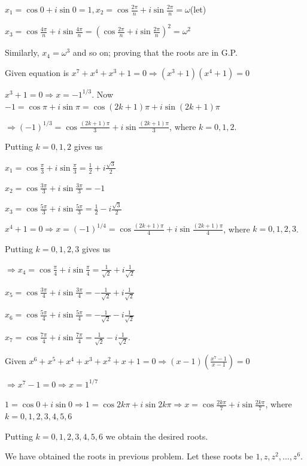   $x_1 = \cos0 + i\sin 0 = 1, x_2 = \cos\frac{2\pi}{n} + i\sin\frac{2\pi}{n} = \omega$(let)

  $x_3 = \cos\frac{4\pi}{n} + i\sin\frac{4\pi}{n} = \left(\cos\frac{2\pi}{n} + i\sin\frac{2\pi}{n}\right)^2
  = \omega^2$

  Similarly, $x_4 = \omega^3$ and so on; proving that the roots are in G.P.
\item Given equation is $x^7 + x^4 + x^3 + 1 = 0 \Rightarrow \left(x^3 + 1\right)\left(x^4 + 1\right) = 0$

  $x^3 + 1 = 0 \Rightarrow x = -1^{1/3}$. Now $-1 = \cos\pi + i\sin\pi = \cos(2k + 1)\pi + i\sin(2k + 1)\pi$

  $\Rightarrow (-1)^{1/3} = \cos\frac{(2k + 1)\pi}{3} + i\sin\frac{(2k + 1)\pi}{3}$, where $k= 0, 1, 2$.

  Putting $k= 0, 1, 2$ gives us

  $x_1 = \cos\frac{\pi}{3} + i\sin\frac{\pi}{3} = \frac{1}{2} + i\frac{\sqrt{3}}{2}$

  $x_2 = \cos\frac{3\pi}{3} + i\sin\frac{3\pi}{3} = -1$

  $x_3 = \cos\frac{5\pi}{3} + i\sin\frac{5\pi}{3} = \frac{1}{2} - i\frac{\sqrt{3}}{2}$

  $x^4 + 1 = 0 \Rightarrow x = (-1)^{1/4} = \cos\frac{(2k + 1)\pi}{4} + i\sin\frac{(2k + 1)\pi}{4}$, where
  $k= 0, 1, 2, 3$.

  Putting $k= 0, 1, 2, 3$ gives us

  $\Rightarrow x_4 = \cos\frac{\pi}{4} + i\sin\frac{\pi}{4} = \frac{1}{\sqrt{2}} + i\frac{1}{\sqrt{2}}$

  $x_5 = \cos\frac{3\pi}{4} + i\sin\frac{3\pi}{4} = -\frac{1}{\sqrt{2}} + i\frac{1}{\sqrt{2}}$

  $x_6 = \cos\frac{5\pi}{4} + i\sin\frac{5\pi}{4} = -\frac{1}{\sqrt{2}} - i\frac{1}{\sqrt{2}}$

  $x_7 = \cos\frac{7\pi}{4} + i\sin\frac{7\pi}{4}= \frac{1}{\sqrt{2}} - i\frac{1}{\sqrt{2}}$.
\item Given $x^6 + x^5 + x^4 + x^3 + x^2 + x + 1 = 0\Rightarrow (x - 1)\left(\frac{x^7 - 1}{x - 1}\right) =
  0$

  $\Rightarrow x^7 - 1 = 0 \Rightarrow x = 1^{1/7}$

  $1 = \cos0 + i\sin0 \Rightarrow 1 = \cos2k\pi + i\sin2k\pi \Rightarrow x = \cos\frac{2k\pi}{7} +
  i\sin\frac{2k\pi}{7}$, where $k = 0, 1, 2, 3, 4, 5, 6$

  Putting $k = 0, 1, 2, 3, 4, 5, 6$ we obtain the desired roots.
\item We have obtained the roots in previous problem. Let these roots be $1, z, z^2, \ldots, z^6$.

